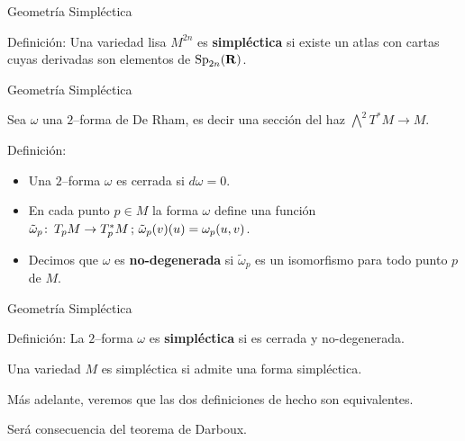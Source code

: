 \documentclass{beamer}
\def\R\re
\def \R{{\bf R}}
\def \re{{\mathbb R}}
\def\co{\colon\thinspace}
\begin{document}
\begin{frame}{Geometría Simpléctica}

 \begin{block}{Definición:}
Una variedad lisa $M^{2n}$ es {\bf simpl\'ectica} si existe un atlas con cartas cuyas derivadas son elementos de  ${\rm Sp}_{2n}(\R)$.
\end{block}


\end{frame}

\begin{frame}{Geometría Simpléctica}

Sea $\omega$ una $2$--forma de De Rham, es decir una secci\'on del haz $\bigwedge^{2}T^{\ast}M\to M$.
\pause

 \begin{block}{Definición:}
 \begin{itemize}
\item Una $2$--forma $\omega$ es cerrada si $d\omega =0$.
\pause
\vfill

 \item  En cada punto $p\in M$ la forma $\omega $ define una funci\'on $\tilde{\omega}_{p}\co T_{p}M\to T_{p}^{\ast}M\, ; \, \tilde{\omega}_{p}(v)(u)=\omega_{p}(u,v)$. 
 \vfill

 \pause
 
 \item  Decimos que $\omega$ es {\bf no-degenerada} si $\tilde{\omega}_{p}$ es un isomorfismo para todo punto $p$ de $M$.
\end{itemize}
\end{block}
\end{frame}

\begin{frame}{Geometría Simpléctica}
 \begin{block}{Definición:}
 La $2$--forma $\omega$ es {\bf simpl\'ectica} si es cerrada y no-degenerada. 
 
 Una variedad $M$ es simpl\'ectica si admite una forma simpl\'ectica. 
\end{block}
\vfill

\pause


M\'as adelante, veremos que las dos definiciones de hecho son equivalentes. 

Ser\'a consecuencia del teorema de Darboux.


\end{frame}
\end{document}
